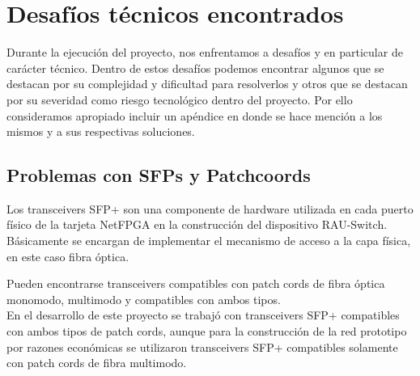 
\chapter{Desaf\'ios t\'ecnicos encontrados}

\ifpdf
    \graphicspath{{Appendix2/Figs/Raster/}{Appendix2/Figs/PDF/}{Appendix2/Figs/}}
\else
    \graphicspath{{Appendix2/Figs/Vector/}{Appendix2/Figs/}}
\fi

Durante la ejecuci\'on del proyecto, nos enfrentamos a desaf\'ios y en particular de carácter t\'ecnico. Dentro de estos desaf\'ios podemos encontrar algunos que se destacan por su complejidad y dificultad para resolverlos y otros que se destacan por su severidad como riesgo tecnol\'ogico dentro del proyecto. Por ello consideramos apropiado incluir un ap\'endice en donde se hace menci\'on a los mismos y a sus respectivas soluciones.

\section{Problemas con SFPs y Patchcoords}

Los transceivers SFP+ son una componente de hardware utilizada en cada puerto f\'isico de la tarjeta NetFPGA en la construcci\'on del dispositivo RAU-Switch. Básicamente se encargan de implementar el mecanismo de acceso a la capa f\'isica, en este caso fibra \'optica.

Pueden encontrarse transceivers compatibles con patch cords de fibra \'optica monomodo, multimodo y compatibles con ambos tipos.\\

En el desarrollo de este proyecto se trabaj\'o con transceivers SFP+ compatibles con ambos tipos de patch cords, aunque para la construcci\'on de la red prototipo por razones econ\'omicas se utilizaron transceivers SFP+ compatibles solamente con patch cords de fibra multimodo.




